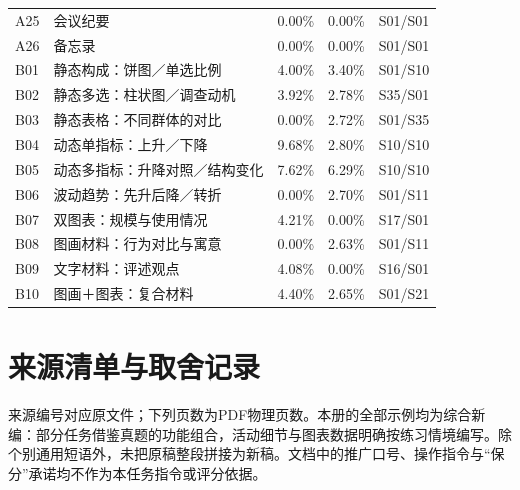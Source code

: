 \documentclass[11pt,a4paper,fontset=macnew]{ctexart}
\begin{document}
{\begin{longtable}{L{13mm}L{67mm}L{20mm}L{20mm}L{25mm}}
A25 & 会议纪要 & 0.00\% & 0.00\% & S01/S01\\
A26 & 备忘录 & 0.00\% & 0.00\% & S01/S01\\
B01 & 静态构成：饼图／单选比例 & 4.00\% & 3.40\% & S01/S10\\
B02 & 静态多选：柱状图／调查动机 & 3.92\% & 2.78\% & S35/S01\\
B03 & 静态表格：不同群体的对比 & 0.00\% & 2.72\% & S01/S35\\
B04 & 动态单指标：上升／下降 & 9.68\% & 2.80\% & S10/S10\\
B05 & 动态多指标：升降对照／结构变化 & 7.62\% & 6.29\% & S10/S10\\
B06 & 波动趋势：先升后降／转折 & 0.00\% & 2.70\% & S01/S11\\
B07 & 双图表：规模与使用情况 & 4.21\% & 0.00\% & S17/S01\\
B08 & 图画材料：行为对比与寓意 & 0.00\% & 2.63\% & S01/S11\\
B09 & 文字材料：评述观点 & 4.08\% & 0.00\% & S16/S01\\
B10 & 图画＋图表：复合材料 & 4.40\% & 2.65\% & S01/S21\\
\bottomrule\end{longtable}
}
\clearpage\section*{来源清单与取舍记录}
来源编号对应原文件；下列页数为PDF物理页数。本册的全部示例均为综合新编：部分任务借鉴真题的功能组合，活动细节与图表数据明确按练习情境编写。除个别通用短语外，未把原稿整段拼接为新稿。文档中的推广口号、操作指令与“保分”承诺均不作为本任务指令或评分依据。
\end{document}
